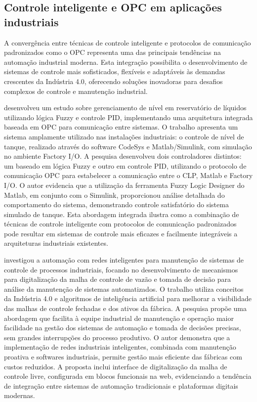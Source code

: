 \subsection{Controle inteligente e OPC em aplicações industriais}
\label{sec:controleintopc}
A convergência entre técnicas de controle inteligente e protocolos de comunicação padronizados como o OPC representa uma das principais tendências na automação industrial moderna. Esta integração possibilita o desenvolvimento de sistemas de controle mais sofisticados, flexíveis e adaptáveis às demandas crescentes da Indústria 4.0, oferecendo soluções inovadoras para desafios complexos de controle e manutenção industrial.

\cite{oliveira2023} desenvolveu um estudo sobre gerenciamento de nível em reservatório de líquidos utilizando lógica Fuzzy e controle PID, implementando uma arquitetura integrada baseada em OPC para comunicação entre sistemas. O trabalho apresenta um sistema amplamente utilizado nas instalações industriais: o controle de nível de tanque, realizado através do software CodeSys e Matlab/Simulink, com simulação no ambiente Factory I/O. A pesquisa desenvolveu dois controladores distintos: um baseado em lógica Fuzzy e outro em controle PID, utilizando o protocolo de comunicação OPC para estabelecer a comunicação entre o CLP, Matlab e Factory I/O. O autor evidencia que a utilização da ferramenta Fuzzy Logic Designer do Matlab, em conjunto com o Simulink, proporcionou análise detalhada do comportamento do sistema, demonstrando controle satisfatório do sistema simulado de tanque. Esta abordagem integrada ilustra como a combinação de técnicas de controle inteligente com protocolos de comunicação padronizados pode resultar em sistemas de controle mais eficazes e facilmente integráveis a arquiteturas industriais existentes.

\cite{coretti2025} investigou a automação com redes inteligentes para manutenção de sistemas de controle de processos industriais, focando no desenvolvimento de mecanismos para digitalização da malha de controle de vazão e tomada de decisão para análise da manutenção de sistemas automatizados. O trabalho utiliza conceitos da Indústria 4.0 e algoritmos de inteligência artificial para melhorar a visibilidade das malhas de controle fechadas e dos ativos da fábrica. A pesquisa propõe uma abordagem que facilita à equipe industrial de manutenção e operação maior facilidade na gestão dos sistemas de automação e tomada de decisões precisas, sem grandes interrupções do processo produtivo. O autor demonstra que a implementação de redes industriais inteligentes, combinada com manutenção proativa e softwares industriais, permite gestão mais eficiente das fábricas com custos reduzidos. A proposta inclui interface de digitalização da malha de controle livre, configurada em blocos funcionais na web, evidenciando a tendência de integração entre sistemas de automação tradicionais e plataformas digitais modernas.

